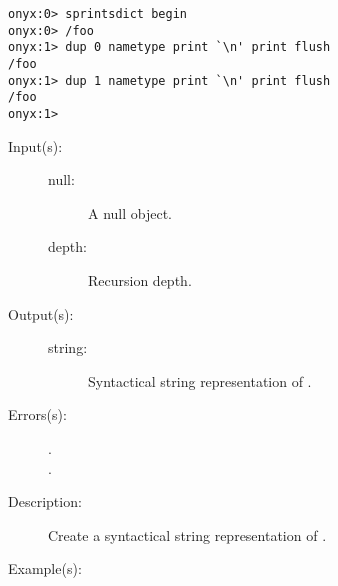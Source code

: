 \begin{description}
\begin{description}
\begin{verbatim}
onyx:0> sprintsdict begin
onyx:0> /foo
onyx:1> dup 0 nametype print `\n' print flush
/foo
onyx:1> dup 1 nametype print `\n' print flush
/foo
onyx:1>
		\end{verbatim}
	\end{description}
\label{sprintsdict:nulltype}
\item[{\onyxop{null depth}{nulltype}{string}}: ]
	\begin{description}\item[]
	\item[Input(s): ]
		\begin{description}\item[]
		\item[null: ]
			A null object.
		\item[depth: ]
			Recursion depth.
		\end{description}
	\item[Output(s): ]
		\begin{description}\item[]
		\item[string: ]
			Syntactical string representation of .
		\end{description}
	\item[Errors(s): ]
		\begin{description}\item[]
		\item[.]
		\item[.]
		\end{description}
	\item[Description: ]
		Create a syntactical string representation of .
	\item[Example(s): ]\begin{verbatim}


\end{verbatim}
\end{description}
\end{description}
